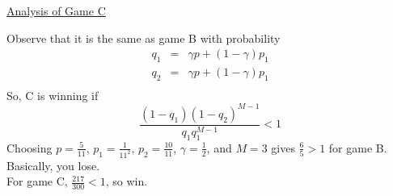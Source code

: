     \begin{center}\underline{Analysis of Game C}\end{center}
    Observe that it is the same as game B with probability
    \begin{eqnarray*}
      q_1 & = & \gamma p + (1 - \gamma) p_1\\
      q_2 & = & \gamma p + (1 - \gamma) p_1\\
    \end{eqnarray*}
    So, C is winning if
    $$
      \frac{(1 - q_1)(1 - q_2)^{M - 1}}{q_1 q_1^{M -1}} < 1
    $$
    Choosing $p = \frac{5}{11}$, $p_1 = \frac{1}{11^2}$, $p_2
    = \frac{10}{11}$, $\gamma = \frac{1}{2}$, and $M = 3$ gives
    $\frac{6}{5} > 1$ for game B. Basically, you lose.\\
    For game C, $\frac{217}{300} < 1$, so win.
